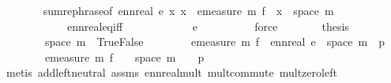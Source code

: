 \begin{isabellebody}
\ \ \ \ \ \ \isamarkupfalse%
\ sum{\isacharunderscore}{\kern0pt}rephrase{\isacharbrackleft}{\kern0pt}of\ {\isachardoublequoteopen}ennreal\ e{\isachardoublequoteclose}\ {\isachardoublequoteopen}{\isasymlambda}x{\isachardot}{\kern0pt}\ x\ {\isacharasterisk}{\kern0pt}\ emeasure\ m\ {\isacharparenleft}{\kern0pt}f\ {\isacharminus}{\kern0pt}{\isacharbackquote}{\kern0pt}\ {\isacharbraceleft}{\kern0pt}x{\isacharbraceright}{\kern0pt}\ {\isasyminter}\ space\ m{\isacharparenright}{\kern0pt}{\isachardoublequoteclose}{\isacharbrackright}{\kern0pt}\ \isanewline
\ \ \ \ \ \ \ \ \ \ \ \ ennreal{\isacharunderscore}{\kern0pt}eq{\isacharunderscore}{\kern0pt}{}{\isacharunderscore}{\kern0pt}iff\isanewline
\ \ \ \ \ \ \ \ \ \ \ \ {\isacartoucheopen}e\ {\isachargreater}{\kern0pt}\ {}{\isacartoucheclose}\isanewline
\ \ \ \ \ \ \isamarkupfalse%
\ force\isanewline
\ \ \ \ \isamarkupfalse%
\ \isamarkupfalse%
\ {\isacharquery}{\kern0pt}thesis\isanewline
\ \ \ \ \ \ \isamarkupfalse%
\ \isanewline
\ \ \ \ \ \ \ \ {\isacartoucheopen}space\ m\ {\isacharequal}{\kern0pt}\ {\isacharbraceleft}{\kern0pt}True{\isacharcomma}{\kern0pt}False{\isacharbraceright}{\kern0pt}{\isacartoucheclose}\isanewline
\ \ \ \ \ \ \ \ {\isacartoucheopen}emeasure\ m\ {\isacharparenleft}{\kern0pt}f\ {\isacharminus}{\kern0pt}{\isacharbackquote}{\kern0pt}\ {\isacharbraceleft}{\kern0pt}ennreal\ e{\isacharbraceright}{\kern0pt}\ {\isasyminter}\ space\ m{\isacharparenright}{\kern0pt}\ {\isacharequal}{\kern0pt}\ p{}{\isacartoucheclose}\isanewline
\ \ \ \ \ \ \ \ {\isacartoucheopen}emeasure\ m\ {\isacharparenleft}{\kern0pt}f\ {\isacharminus}{\kern0pt}{\isacharbackquote}{\kern0pt}\ {\isacharbraceleft}{\kern0pt}{}{\isacharbraceright}{\kern0pt}\ {\isasyminter}\ space\ m{\isacharparenright}{\kern0pt}\ {\isacharequal}{\kern0pt}\ {}\ {\isacharminus}{\kern0pt}\ p{}{\isacartoucheclose}\isanewline
\ \ \ \ \ \ \isamarkupfalse%
\ {\isacharparenleft}{\kern0pt}metis\ add{\isachardot}{\kern0pt}left{\isacharunderscore}{\kern0pt}neutral\ assms{\isacharparenleft}{\kern0pt}{}{\isacharparenright}{\kern0pt}\ ennreal{\isacharunderscore}{\kern0pt}mult{\isacharprime}{\kern0pt}{\isacharprime}{\kern0pt}\ mult{\isachardot}{\kern0pt}commute\ mult{\isacharunderscore}{\kern0pt}zero{\isacharunderscore}{\kern0pt}left{\isacharparenright}{\kern0pt}\isanewline
\ \ \isamarkupfalse%
\isanewline
{}\isamarkupfalse%
%
\endisatagproof
{\isafoldproof}%

\end{isabellebody}
